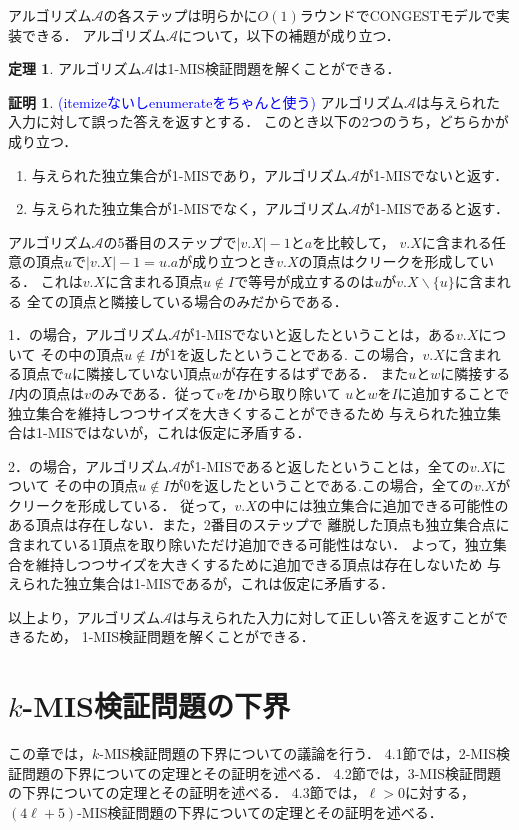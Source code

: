 \documentclass[12pt]{thesis}
\newcommand{\Izumi}[1]{\textcolor{blue}{(#1)}}
\newcommand{\CONGEST}{\textsf{CONGEST}}
\theoremstyle{definition}
\newtheorem{theorem}{定理}[chapter]
\newtheorem*{prf*}{証明}
\begin{document}
アルゴリズム$\mathcal{A}$の各ステップは明らかに$O(1)$ラウンドで{\CONGEST}モデルで実装できる．
アルゴリズム$\mathcal{A}$について，以下の補題が成り立つ．
\begin{theorem}
アルゴリズム$\mathcal{A}$は1-MIS検証問題を解くことができる．
\end{theorem}
\begin{prf*}
\Izumi{itemizeないしenumerateをちゃんと使う}
アルゴリズム$\mathcal{A}$は与えられた入力に対して誤った答えを返すとする．
このとき以下の2つのうち，どちらかが成り立つ． 
\begin{enumerate}
\item 与えられた独立集合が1-MISであり，アルゴリズム$\mathcal{A}$が1-MISでないと返す． 
\item 与えられた独立集合が1-MISでなく，アルゴリズム$\mathcal{A}$が1-MISであると返す． 
\end{enumerate}
アルゴリズム$\mathcal{A}$の5番目のステップで$|v.X| - 1$と$a$を比較して，
$v.X$に含まれる任意の頂点$u$で$|v.X| - 1 = u.a$が成り立つとき$v.X$の頂点はクリークを形成している．
これは$v.X$に含まれる頂点$u \notin I$で等号が成立するのは$u$が$v.X \backslash \{u\}$に含まれる
全ての頂点と隣接している場合のみだからである．

1．の場合，アルゴリズム$\mathcal{A}$が1-MISでないと返したということは，ある$v.X$について
その中の頂点$u \notin I$が1を返したということである.
この場合，$v.X$に含まれる頂点で$u$に隣接していない頂点$w$が存在するはずである．
また$u$と$w$に隣接する$I$内の頂点は$v$のみである．従って$v$を$I$から取り除いて
$u$と$w$を$I$に追加することで独立集合を維持しつつサイズを大きくすることができるため
与えられた独立集合は1-MISではないが，これは仮定に矛盾する． 

2．の場合，アルゴリズム$\mathcal{A}$が1-MISであると返したということは，全ての$v.X$について
その中の頂点$u \notin I$が0を返したということである.この場合，全ての$v.X$がクリークを形成している．
従って，$v.X$の中には独立集合に追加できる可能性のある頂点は存在しない．また，2番目のステップで
離脱した頂点も独立集合点に含まれている1頂点を取り除いただけ追加できる可能性はない．
よって，独立集合を維持しつつサイズを大きくするために追加できる頂点は存在しないため
与えられた独立集合は1-MISであるが，これは仮定に矛盾する． 

以上より，アルゴリズム$\mathcal{A}$は与えられた入力に対して正しい答えを返すことができるため，
1-MIS検証問題を解くことができる．
\end{prf*}
\newpage

\chapter{$k$-MIS検証問題の下界}
この章では，$k$-MIS検証問題の下界についての議論を行う．
4.1節では，2-MIS検証問題の下界についての定理とその証明を述べる．
4.2節では，3-MIS検証問題の下界についての定理とその証明を述べる．
4.3節では，$\ell > 0$に対する，$(4\ell + 5)$-MIS検証問題の下界についての定理とその証明を述べる．
\end{document}
